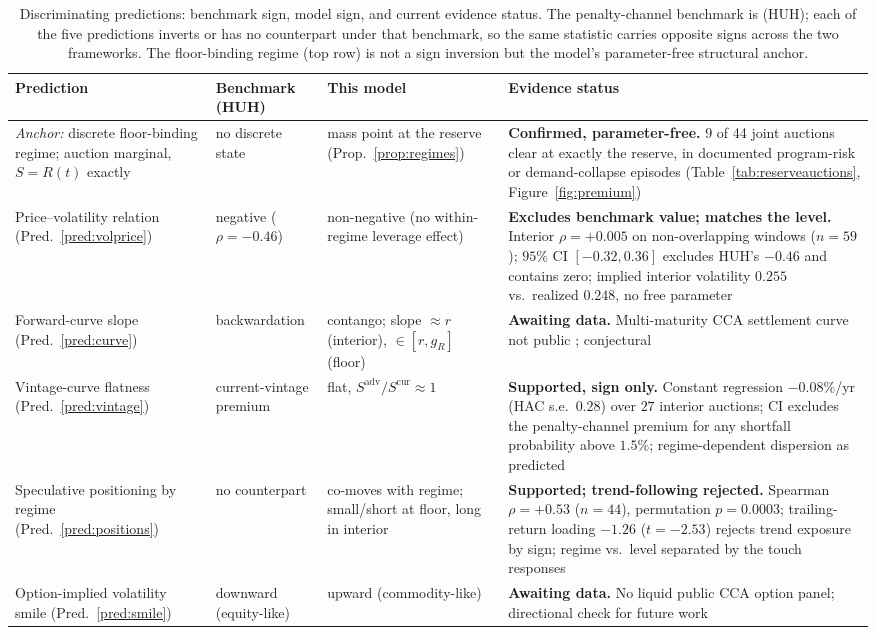 \documentclass[11pt,letterpaper]{article}
\theoremstyle{plain}
\theoremstyle{definition}
\numberwithin{equation}{section}
\begin{document}
\begin{table}[H]\centering
\caption{Discriminating predictions: benchmark sign, model sign, and current evidence
status. The penalty-channel benchmark is \citet{hitzemann2018} (HUH); each of the five predictions inverts or has no counterpart under that benchmark, so the same statistic carries opposite signs across the two frameworks. The floor-binding regime (top row) is not a sign inversion but the model's parameter-free structural anchor.}
\label{tab:predictions}
\footnotesize
\begin{tabular}{@{}p{} p{} p{} p{}@{}}
\toprule
Prediction & Benchmark (HUH) & This model & Evidence status\\
\midrule
\textit{Anchor:} discrete floor-binding regime; auction marginal, $S=R(t)$ exactly
 & no discrete state & mass point at the reserve (Prop.~\ref{prop:regimes})
 & \textbf{Confirmed, parameter-free.} 9 of 44 joint auctions clear at exactly the reserve, in documented program-risk or demand-collapse episodes (Table~\ref{tab:reserveauctions}, Figure~\ref{fig:premium})\\
\addlinespace[3pt]
Price--volatility relation (Pred.~\ref{pred:volprice})
 & negative ($\rho=-0.46$) & non-negative (no within-regime leverage effect)
 & \textbf{Excludes benchmark value; matches the level.} Interior $\rho=+0.005$ on non-overlapping windows ($n=59$); $95\%$ CI $[-0.32, 0.36]$ excludes HUH's $-0.46$ and contains zero; implied interior volatility $0.255$ vs.\ realized $0.248$, no free parameter\\
\addlinespace[3pt]
Forward-curve slope (Pred.~\ref{pred:curve})
 & backwardation & contango; slope $\approx r$ (interior), $\in[r,g_R]$ (floor)
 & \textbf{Awaiting data.} Multi-maturity CCA settlement curve not public \citep{shi2023}; conjectural\\
\addlinespace[3pt]
Vintage-curve flatness (Pred.~\ref{pred:vintage})
 & current-vintage premium & flat, $S^{\mathrm{adv}}/S^{\mathrm{cur}}\approx1$
 & \textbf{Supported, sign only.} Constant regression $-0.08\%$/yr (HAC s.e.\ $0.28$) over $27$ interior auctions; CI excludes the penalty-channel premium for any shortfall probability above $1.5\%$; regime-dependent dispersion as predicted\\
\addlinespace[3pt]
Speculative positioning by regime (Pred.~\ref{pred:positions})
 & no counterpart & co-moves with regime; small/short at floor, long in interior
 & \textbf{Supported; trend-following rejected.} Spearman $\rho=+0.53$ ($n=44$), permutation $p=0.0003$; trailing-return loading $-1.26$ ($t=-2.53$) rejects trend exposure by sign; regime vs.\ level separated by the touch responses\\
\addlinespace[3pt]
Option-implied volatility smile (Pred.~\ref{pred:smile})
 & downward (equity-like) & upward (commodity-like)
 & \textbf{Awaiting data.} No liquid public CCA option panel; directional check for future work\\
\bottomrule
\end{tabular}


\end{table}
\end{document}
